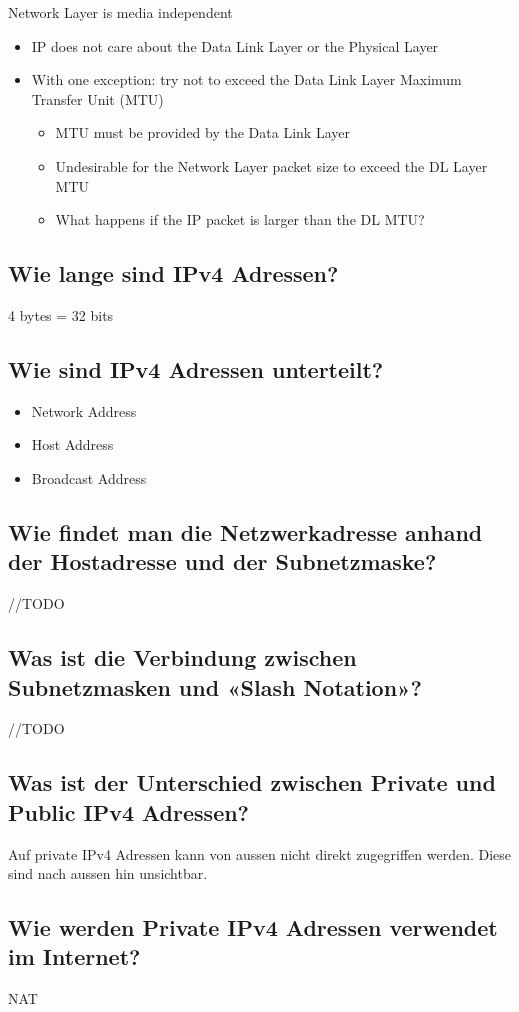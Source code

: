 Network Layer is media independent
\begin{itemize}
    \item IP does not care about the Data Link Layer or the Physical Layer
    \item With one exception: try not to exceed the Data Link Layer Maximum Transfer Unit (MTU)
    \begin{itemize}
        \item MTU must be provided by the Data Link Layer
        \item Undesirable for the Network Layer packet size to exceed the DL Layer MTU
        \item What happens if the IP packet is larger than the DL MTU?
    \end{itemize}
\end{itemize}
\subsection*{Wie lange sind IPv4 Adressen?}
4 bytes = 32 bits
\subsection*{Wie sind IPv4 Adressen unterteilt?}
\begin{itemize}
    \item Network Address
    \item Host Address
    \item Broadcast Address
\end{itemize}
\subsection*{Wie findet man die Netzwerkadresse anhand der Hostadresse und der Subnetzmaske?}
//TODO
\subsection*{Was ist die Verbindung zwischen Subnetzmasken und «Slash Notation»?}
//TODO
\subsection*{Was ist der Unterschied zwischen Private und Public IPv4 Adressen?}
Auf private IPv4 Adressen kann von aussen nicht direkt zugegriffen werden. Diese sind nach aussen hin unsichtbar.
\subsection*{Wie werden Private IPv4 Adressen verwendet im Internet?}
NAT
